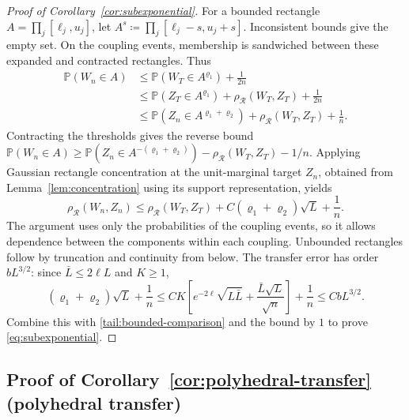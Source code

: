 \documentclass[11pt,letterpaper]{article}
\theoremstyle{remark}
\newcommand{\Pp}{\mathbb P}
\newcommand{\rh}{\rho_{\mathcal R}}
\begin{document}
\begin{proof}[Proof of Corollary~\ref{cor:subexponential}]
For a bounded rectangle \(A=\prod_j[\ell_j,u_j]\), let
\(A^s\coloneqq\prod_j[\ell_j-s,u_j+s]\). Inconsistent bounds
give the empty set. On the coupling events, membership is sandwiched
between these expanded and contracted rectangles. Thus
\begin{align*}
 \Pp(W_n\in A)
 &\le\Pp(W_T\in A^{\varrho_1})+\frac1{2n}\\
 &\le\Pp(Z_T\in A^{\varrho_1})+\rh(W_T,Z_T)+\frac1{2n}\\
 &\le\Pp(Z_n\in A^{\varrho_1+\varrho_2})+\rh(W_T,Z_T)+\frac1n.
\end{align*}
Contracting the thresholds gives the reverse bound
\(\Pp(W_n\in A)\ge\Pp(Z_n\in A^{-(\varrho_1+\varrho_2)})
-\rh(W_T,Z_T)-1/n\). Applying Gaussian rectangle concentration at
the unit-marginal target \(Z_n\), obtained from Lemma~\ref{lem:concentration}
using its support representation, yields
\begin{equation}
 \rh(W_n,Z_n)\le\rh(W_T,Z_T)
       +C(\varrho_1+\varrho_2)\sqrt L+\frac1n.
 \label{tail:transfer}
\end{equation}
The argument uses only the probabilities of the coupling events,
so it allows dependence between the components within each coupling. Unbounded
rectangles follow by truncation and continuity from below.
The transfer error has order \(bL^{3/2}\): since
\(\bar L\le2\ell L\) and \(K\ge1\),
\[
 (\varrho_1+\varrho_2)\sqrt L+\frac1n
 \le CK\left[e^{-2\ell}\sqrt{L\bar L}
                     +\frac{\bar L\sqrt L}{\sqrt n}\right]+\frac1n
 \le CbL^{3/2}.
\]
Combine this with \eqref{tail:bounded-comparison} and the bound by \(1\)
to prove \eqref{eq:subexponential}.

\end{proof}

\subsection{Proof of Corollary~\ref*{cor:polyhedral-transfer} (polyhedral transfer)}
\label{app:polyhedral-transfer}
\end{document}
